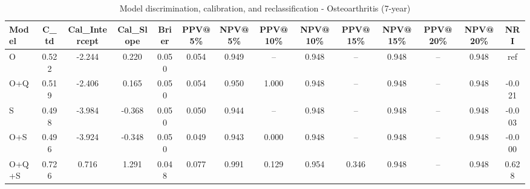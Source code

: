 \begin{table}[htbp]
\centering
\small
\caption{Model discrimination, calibration, and reclassification - Osteoarthritis (7-year)}
\label{tab:perf_osteoarthritis_7y}
\begin{tabular}{lccccccccccccc}
\toprule
Model & C\_td & Cal\_Intercept & Cal\_Slope & Brier & PPV@5\% & NPV@5\% & PPV@10\% & NPV@10\% & PPV@15\% & NPV@15\% & PPV@20\% & NPV@20\% & NRI \\
\midrule
O & 0.522 & -2.244 & 0.220 & 0.050 & 0.054 & 0.949 & -- & 0.948 & -- & 0.948 & -- & 0.948 & ref \\
O+Q & 0.519 & -2.406 & 0.165 & 0.050 & 0.054 & 0.950 & 1.000 & 0.948 & -- & 0.948 & -- & 0.948 & -0.021 \\
S & 0.498 & -3.984 & -0.368 & 0.050 & 0.050 & 0.944 & -- & 0.948 & -- & 0.948 & -- & 0.948 & -0.003 \\
O+S & 0.496 & -3.924 & -0.348 & 0.050 & 0.049 & 0.943 & 0.000 & 0.948 & -- & 0.948 & -- & 0.948 & -0.000 \\
O+Q+S & 0.726 & 0.716 & 1.291 & 0.048 & 0.077 & 0.991 & 0.129 & 0.954 & 0.346 & 0.948 & -- & 0.948 & 0.628 \\
\bottomrule
\end{tabular}
\end{table}